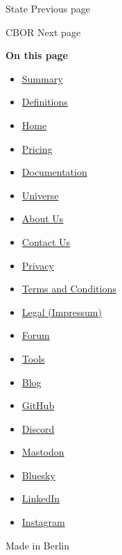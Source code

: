 \href{/docs/reference/introspection/state/}{\pandocbounded{}}

{ State } { Previous page }

\href{/docs/reference/data-loading/cbor/}{\pandocbounded{}}

{ CBOR } { Next page }

\textbf{On this page}

\begin{itemize}
\tightlist
\item
  \hyperref[summary]{Summary}
\item
  \hyperref[definitions]{Definitions}
\end{itemize}

\begin{itemize}
\tightlist
\item
  \href{/}{Home}
\item
  \href{/pricing/}{Pricing}
\item
  \href{/docs/}{Documentation}
\item
  \href{/universe/}{Universe}
\item
  \href{/about/}{About Us}
\item
  \href{/contact/}{Contact Us}
\item
  \href{/privacy/}{Privacy}
\item
  \href{https://typst.app/terms}{Terms and Conditions}
\item
  \href{/legal/}{Legal (Impressum)}
\end{itemize}

\begin{itemize}
\tightlist
\item
  \href{https://forum.typst.app}{Forum}
\item
  \href{/tools/}{Tools}
\item
  \href{/blog/}{Blog}
\item
  \href{https://github.com/typst/}{GitHub}
\item
  \href{https://discord.gg/2uDybryKPe}{Discord}
\item
  \href{https://mastodon.social/@typst}{Mastodon}
\item
  \href{https://bsky.app/profile/typst.app}{Bluesky}
\item
  \href{https://www.linkedin.com/company/typst/}{LinkedIn}
\item
  \href{https://instagram.com/typstapp/}{Instagram}
\end{itemize}

Made in Berlin
